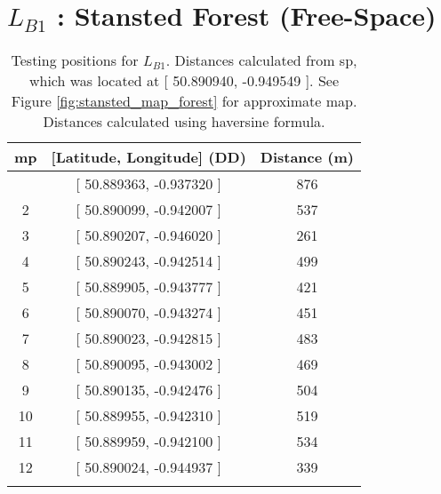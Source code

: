 \chapter{$L_{B1}$ : Stansted Forest (Free-Space)}\label{sec:stansted_free_test_pos}

\begin{table}[H]
\centering
\caption[Testing positions for $L_{B1}$]{Testing positions for $L_{B1}$. Distances calculated from \ac{sp}, which was located at [ 50.890940, -0.949549 ]. See Figure \ref{fig:stansted_map_forest} for approximate map. Distances calculated using haversine formula.}
\begin{tabular}{ccc}
    \toprule
\textbf{\ac{mp}} & \textbf{[Latitude, Longitude]} (DD) & \textbf{Distance} (m)\\
    \midrule\addlinespace
1 & [ 50.889363, -0.937320 ] & 876 \\
2 & [ 50.890099, -0.942007 ] & 537 \\
3 & [ 50.890207, -0.946020 ] & 261 \\
4 & [ 50.890243, -0.942514 ] & 499 \\
5 & [ 50.889905, -0.943777 ] & 421 \\
6 & [ 50.890070, -0.943274 ] & 451 \\
7 & [ 50.890023, -0.942815 ] & 483 \\
8 & [ 50.890095, -0.943002 ] & 469 \\
9 & [ 50.890135, -0.942476 ] & 504 \\
10 & [ 50.889955, -0.942310 ] & 519 \\
11 & [ 50.889959, -0.942100 ] & 534 \\
12 & [ 50.890024, -0.944937 ] & 339 \\
    \addlinespace\bottomrule
\end{tabular}
\end{table}

